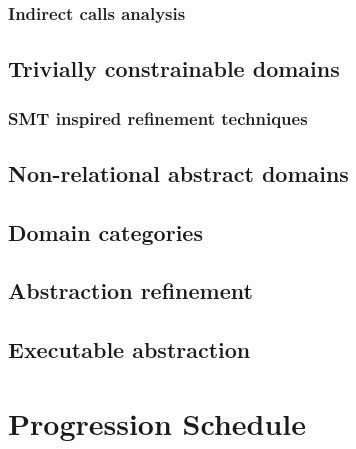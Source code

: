 \subsubsection{Indirect calls analysis}

\subsection{Trivially constrainable domains}

\subsubsection{SMT inspired refinement techniques}




\subsection{Non-relational abstract domains}


\subsection{ Domain categories }






\subsection{Abstraction refinement}



\subsection{ Executable abstraction }

\section{Progression Schedule}
